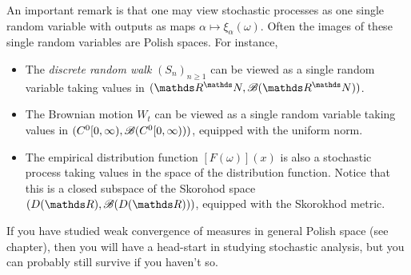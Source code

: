 \begin{unexaminable}
An important remark is that one may view stochastic processes as one single random variable with outputs as maps $\alpha \mapsto \xi_\alpha(\omega)$. Often the images of these single random variables are Polish spaces. For instance,
\begin{itemize}
\item The \textit{discrete random walk} $(S_n)_{n\geq 1}$ can be viewed as a single random variable taking values in $(\R^\N, \B(\R^\N))$.
\item The Brownian motion $W_t$ can be viewed as a single random variable taking values in $(C^0[0,\infty), \mathcal{B}(C^0[0,\infty)))$, equipped with the uniform norm.
\item The empirical distribution function $[F(\omega)](x)$ is also a stochastic process taking values in the space of the distribution function. Notice that this is a closed subspace of the Skorohod space $(D(\R), \B(D(\R)))$, equipped with the Skorokhod metric.
\end{itemize}
If you have studied weak convergence of measures in general Polish space (see chapter), then you will have a head-start in studying stochastic analysis, but you can probably still survive if you haven't so.
\end{unexaminable}
\newpage